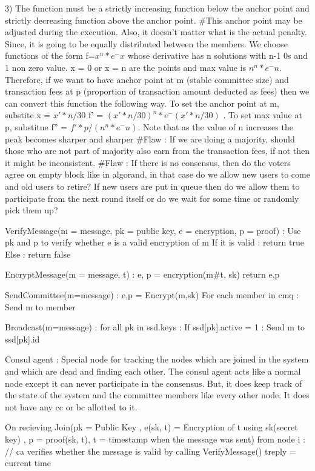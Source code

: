     3) The function must be a strictly increasing function below the anchor point and strictly decreasing function above the anchor point.
#This anchor point may be adjusted during the execution. Also, it doesn't matter what is the actual penalty. Since, it is going to be equally distributed between the members.
We choose functions of the form f=$x^n*e^-x$ whose derivative has n solutions with n-1 0s and 1 non zero value. x = 0 or x = n are the points and max value is $n^n*e^-n$. Therefore, if we want to have anchor point at m (stable committee size) and transaction fees at p (proportion of transaction amount deducted as fees) then we can convert this function the following way.
To set the anchor point at m, substite x = $x'*n/30$ f' = $(x'*n/30)^n*e^-(x'*n/30)$ . To set max value at p, substitue f'' = $f'*p/(n^n*e^-n)$.
Note that as the value of n increases the peak becomes sharper and sharper
#Flaw : If we are doing a majority, should those who are not part of majority also earn from the transaction fees, if not then it might be inconsistent.
#Flaw : If there is no consensus, then do the voters agree on empty block like in algorand, in that case do we allow new users to come and old users to retire? If new users are put in queue then do we allow them to participate from the next round itself or do we wait for some time or randomly pick them up?

VerifyMessage(m = message, pk = public key, e = encryption, p = proof) :
    Use pk and p to verify whether e is a valid encryption of m
    If it is valid :
        return true
    Else :
        return false

EncryptMessage(m = message, t) :
    e, p = encryption(m#t, sk)
    return e,p
    
SendCommittee(m=message) :
    e,p = Encrypt(m,sk)
    For each member in cmq :
        Send m to member
        
Broadcast(m=message) :
    for all pk in ssd.keys :
        If ssd[pk].active = 1 :
            Send m to ssd[pk].id
    
Consul agent : Special node for tracking the nodes which are joined in the system and which are dead and finding each other. The consul agent acts like a normal node except it can never participate in the consensus. But, it does keep track of the state of the system and the committee members like every other node. It does not have any cc or bc allotted to it.

On recieving Join(pk = Public Key , e(sk, t) = Encryption of t using sk(secret key) , p = proof(sk, t), t = timestamp when the message was sent) from node i :
    // ca verifies whether the message is valid by calling VerifyMessage()
    treply = current time
    
